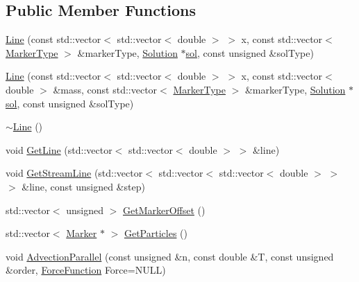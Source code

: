 \subsection*{Public Member Functions}
\begin{DoxyCompactItemize}
\item 
\mbox{\hyperlink{classfemus_1_1_line_aad99c588f3951a674fe69d50f5978d8f}{Line}} (const std\+::vector$<$ std\+::vector$<$ double $>$ $>$ x, const std\+::vector$<$ \mbox{\hyperlink{_marker_type_enum_8hpp_ade22213fff69cfb37d8238e8fd3073df}{Marker\+Type}} $>$ \&marker\+Type, \mbox{\hyperlink{classfemus_1_1_solution}{Solution}} $\ast$\mbox{\hyperlink{classfemus_1_1_line_a6f026b817f6622d68af15ba6b9f72b58}{sol}}, const unsigned \&sol\+Type)
\item 
\mbox{\hyperlink{classfemus_1_1_line_a21085c1a5d813f311cd7bc984306dc03}{Line}} (const std\+::vector$<$ std\+::vector$<$ double $>$ $>$ x, const std\+::vector$<$ double $>$ \&mass, const std\+::vector$<$ \mbox{\hyperlink{_marker_type_enum_8hpp_ade22213fff69cfb37d8238e8fd3073df}{Marker\+Type}} $>$ \&marker\+Type, \mbox{\hyperlink{classfemus_1_1_solution}{Solution}} $\ast$\mbox{\hyperlink{classfemus_1_1_line_a6f026b817f6622d68af15ba6b9f72b58}{sol}}, const unsigned \&sol\+Type)
\item 
\mbox{\hyperlink{classfemus_1_1_line_a2ee2052aae5a265496dd4a28e3eac459}{$\sim$\+Line}} ()
\item 
void \mbox{\hyperlink{classfemus_1_1_line_a0623915f9f27153ef5e477b3a566256d}{Get\+Line}} (std\+::vector$<$ std\+::vector$<$ double $>$ $>$ \&line)
\item 
void \mbox{\hyperlink{classfemus_1_1_line_a4e7742ddfcf4f4e27cff81c51dbd5afd}{Get\+Stream\+Line}} (std\+::vector$<$ std\+::vector$<$ std\+::vector$<$ double $>$ $>$ $>$ \&line, const unsigned \&step)
\item 
std\+::vector$<$ unsigned $>$ \mbox{\hyperlink{classfemus_1_1_line_ac2e1543fbce24c1cee46ed57b3346274}{Get\+Marker\+Offset}} ()
\item 
std\+::vector$<$ \mbox{\hyperlink{classfemus_1_1_marker}{Marker}} $\ast$ $>$ \mbox{\hyperlink{classfemus_1_1_line_a2e4c6573a390a51a6d5ae4f98d274c8c}{Get\+Particles}} ()
\item 
void \mbox{\hyperlink{classfemus_1_1_line_a4ee4b75bb07d8849015130c57dfde0d7}{Advection\+Parallel}} (const unsigned \&n, const double \&T, const unsigned \&order, \mbox{\hyperlink{classfemus_1_1_line_a34a5fe4198ea2eb339bffeef484ae77e}{Force\+Function}} Force=N\+U\+LL)
\item 

\end{DoxyCompactItemize}

